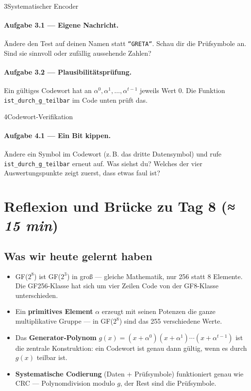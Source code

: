 \begin{pythoneinheit}{3}{Systematischer Encoder}

\paragraph{Aufgabe 3.1 — Eigene Nachricht.}
Ändere den Test auf deinen Namen statt \texttt{“GRETA“}. Schau dir
die Prüfsymbole an. Sind sie sinnvoll oder zufällig aussehende Zahlen?

\paragraph{Aufgabe 3.2 — Plausibilitätsprüfung.}
Ein gültiges Codewort hat an $\alpha^0, \alpha^1, \dots, \alpha^{t-1}$
jeweils Wert 0. Die Funktion \texttt{ist\_durch\_g\_teilbar} im Code
unten prüft das.
\end{pythoneinheit}

\begin{pythoneinheit}{4}{Codewort-Verifikation}

\paragraph{Aufgabe 4.1 — Ein Bit kippen.}
Ändere ein Symbol im Codewort (z.\,B. das dritte Datensymbol) und
rufe \texttt{ist\_durch\_g\_teilbar} erneut auf. Was siehst du?
Welches der vier Auswertungspunkte zeigt zuerst, dass etwas faul ist?
\end{pythoneinheit}

\section{Reflexion und Brücke zu Tag 8 \normalfont(\textit{≈ 15 min})}

\subsection*{Was wir heute gelernt haben}

\begin{itemize}
\item GF($2^8$) ist GF($2^3$) in groß — gleiche Mathematik, nur 256
  statt 8 Elemente. Die GF256-Klasse hat sich um vier Zeilen Code
  von der GF8-Klasse unterschieden.
\item Ein \textbf{primitives Element} $\alpha$ erzeugt mit seinen
  Potenzen die ganze multiplikative Gruppe — in GF($2^8$) sind das
  255 verschiedene Werte.
\item Das \textbf{Generator-Polynom} $g(x) = (x+\alpha^0)(x+\alpha^1)
  \cdots (x+\alpha^{t-1})$ ist die zentrale Konstruktion: ein Codewort
  ist genau dann gültig, wenn es durch $g(x)$ teilbar ist.
\item \textbf{Systematische Codierung} (Daten + Prüfsymbole)
  funktioniert genau wie CRC — Polynomdivision modulo $g$, der Rest
  sind die Prüfsymbole.
\end{itemize}


